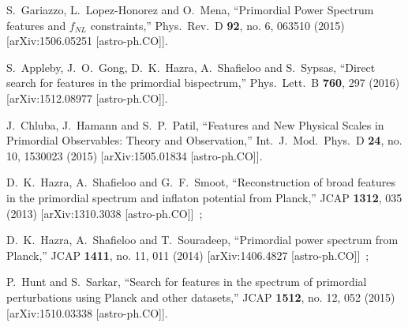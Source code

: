 \documentclass[12pt]{article}
\begin{document}
\begin{thebibliography}{99}
  
  S.~Gariazzo, L.~Lopez-Honorez and O.~Mena,
  ``Primordial Power Spectrum features and $f_{NL}$ constraints,''
  Phys.\ Rev.\ D {\bf 92}, no. 6, 063510 (2015)
  [arXiv:1506.05251 [astro-ph.CO]].
  



  S.~Appleby, J.~O.~Gong, D.~K.~Hazra, A.~Shafieloo and S.~Sypsas,
  ``Direct search for features in the primordial bispectrum,''
  Phys.\ Lett.\ B {\bf 760}, 297 (2016)
  [arXiv:1512.08977 [astro-ph.CO]].


  J.~Chluba, J.~Hamann and S.~P.~Patil,
  ``Features and New Physical Scales in Primordial Observables: Theory and Observation,''
  Int.\ J.\ Mod.\ Phys.\ D {\bf 24}, no. 10, 1530023 (2015)
  [arXiv:1505.01834 [astro-ph.CO]].

  
  
  
  
  
  
  
  
  
  
  
  D.~K.~Hazra, A.~Shafieloo and G.~F.~Smoot,
  ``Reconstruction of broad features in the primordial spectrum and inflaton potential from Planck,''
  JCAP {\bf 1312}, 035 (2013)
  [arXiv:1310.3038 [astro-ph.CO]]~;


  D.~K.~Hazra, A.~Shafieloo and T.~Souradeep,
  ``Primordial power spectrum from Planck,''
  JCAP {\bf 1411}, no. 11, 011 (2014)
  [arXiv:1406.4827 [astro-ph.CO]]~;

  P.~Hunt and S.~Sarkar,
  ``Search for features in the spectrum of primordial perturbations using Planck and other datasets,''
  JCAP {\bf 1512}, no. 12, 052 (2015)
  [arXiv:1510.03338 [astro-ph.CO]].



\end{thebibliography}
\end{document}
